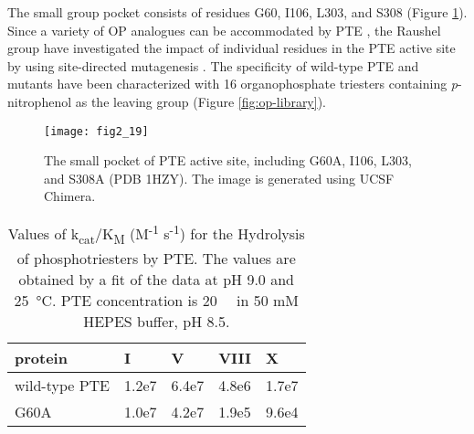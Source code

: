 \begin{refsection}
The small group pocket consists of residues G60, I106, L303, and S308
\cite{Hanusa2011} (Figure \ref{fig:small-pocket}). Since a variety of OP
analogues can be accommodated by PTE \cite{Hong1999}, the Raushel group have
investigated the impact of individual residues in the PTE active site by using
site-directed mutagenesis \cite{Chen-Goodspeed2001a}. The specificity of
wild-type PTE and mutants have been characterized with 16 organophosphate
triesters containing \emph{p}-nitrophenol as the leaving group (Figure
\ref{fig:op-library}). 
\begin{figure}[htbp] \centering \texttt{[image: fig2\_19]}
    \caption[The small pocket of PTE active site, including G60A, I106, L303,
    and S308A (PDB 1HZY). The image is generated using UCSF Chimera.] {The
        small pocket of PTE active site, including G60A, I106, L303, and S308A
        (PDB 1HZY). The image is generated using UCSF Chimera.}
        \label{fig:small-pocket}
\end{figure}
\begin{table}[htbp]
    \centering
    \caption[Values of k\textsubscript{cat}/K\textsubscript{M}
    (M\textsuperscript{-1} s\textsuperscript{-1}) for the Hydrolysis of
    phosphotriesters by PTE. The values are obtained by a fit of the data at pH
    9.0 and \SI{25}{\celsius}. PTE concentration is \SI{20}{\nano\Molar} in 50
    mM HEPES buffer, pH 8.5.] {Values of
        k\textsubscript{cat}/K\textsubscript{M} (M\textsuperscript{-1}
        s\textsuperscript{-1}) for the Hydrolysis of phosphotriesters by PTE.
        The values are obtained by a fit of the data at pH 9.0 and
        \SI{25}{\celsius}. PTE concentration is \SI{20}{\nano\Molar} in 50 mM
        HEPES buffer, pH 8.5.}
    \begin{tabular}{lllll}
    \hline

    protein & I & V & VIII & X \\
    \hline

    wild-type PTE & 1.2e7 & 6.4e7 & 4.8e6 & 1.7e7 \\
    G60A & 1.0e7 & 4.2e7 & 1.9e5 & 9.6e4 \\

    \hline  
    \end{tabular}
    \label{tab:pte-g60a}
\end{table}


\end{refsection}
